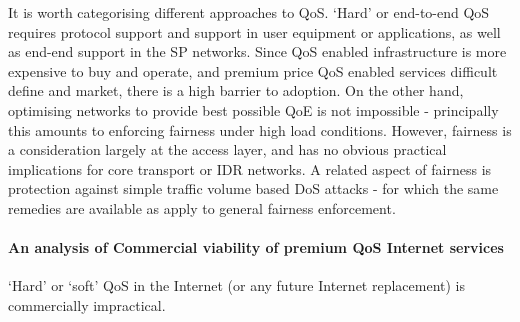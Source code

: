 It is worth categorising different approaches to QoS.
‘Hard’ or end-to-end QoS requires protocol support and support in user equipment or applications, as well as end-end support in the SP networks.
Since QoS enabled infrastructure is more expensive to buy and operate, and premium price QoS enabled services difficult define and market, there is a high barrier to adoption.
On the other hand, optimising networks to provide best possible QoE is not impossible - principally this amounts to enforcing fairness under high load conditions.
However, fairness is a consideration largely at the access layer, and has no obvious practical implications for core transport or IDR networks.
A related aspect of fairness is protection against simple traffic volume based DoS attacks - for which the same remedies are available as apply to general fairness enforcement.

\paragraph{An analysis of Commercial viability of premium QoS Internet services}

‘Hard’ or ‘soft’ QoS in the Internet (or any future Internet replacement) is commercially impractical.

